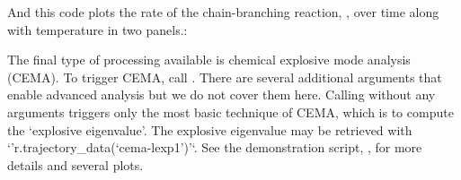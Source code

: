 \documentclass[letterpaper,10pt,english]{sphinxmanual}
\begin{document}
And this code plots the rate of the chain-branching reaction, , over time along with temperature in two panels.:

\begin{sphinxVerbatim}[commandchars=\\\{\}]
 
 
\end{sphinxVerbatim}

The final type of  processing available is chemical explosive mode analysis (CEMA).
To trigger CEMA, call .
There are several additional arguments that enable advanced analysis but we do not cover them here.
Calling  without any arguments triggers only the most basic technique of CEMA, which is to compute the ‘explosive eigenvalue’.
The explosive eigenvalue may be retrieved with ‘’r.trajectory\_data(‘cema-lexp1’)’‘.
See the demonstration script, , for more details and several plots.
\end{document}
